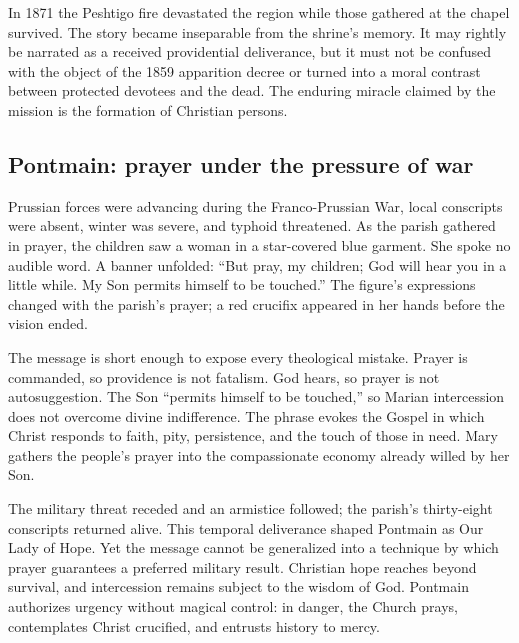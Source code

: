 In 1871 the Peshtigo fire devastated the region while those gathered at the chapel survived. The story became inseparable from the shrine's memory. It may rightly be narrated as a received providential deliverance, but it must not be confused with the object of the 1859 apparition decree or turned into a moral contrast between protected devotees and the dead. The enduring miracle claimed by the mission is the formation of Christian persons.

\subsection{Pontmain: prayer under the pressure of war}


Prussian forces were advancing during the Franco-Prussian War, local conscripts were absent, winter was severe, and typhoid threatened. As the parish gathered in prayer, the children saw a woman in a star-covered blue garment. She spoke no audible word. A banner unfolded: ``But pray, my children; God will hear you in a little while. My Son permits himself to be touched.'' The figure's expressions changed with the parish's prayer; a red crucifix appeared in her hands before the vision ended.

The message is short enough to expose every theological mistake. Prayer is commanded, so providence is not fatalism. God hears, so prayer is not autosuggestion. The Son ``permits himself to be touched,'' so Marian intercession does not overcome divine indifference. The phrase evokes the Gospel in which Christ responds to faith, pity, persistence, and the touch of those in need. Mary gathers the people's prayer into the compassionate economy already willed by her Son.

The military threat receded and an armistice followed; the parish's thirty-eight conscripts returned alive. This temporal deliverance shaped Pontmain as Our Lady of Hope. Yet the message cannot be generalized into a technique by which prayer guarantees a preferred military result. Christian hope reaches beyond survival, and intercession remains subject to the wisdom of God. Pontmain authorizes urgency without magical control: in danger, the Church prays, contemplates Christ crucified, and entrusts history to mercy.

